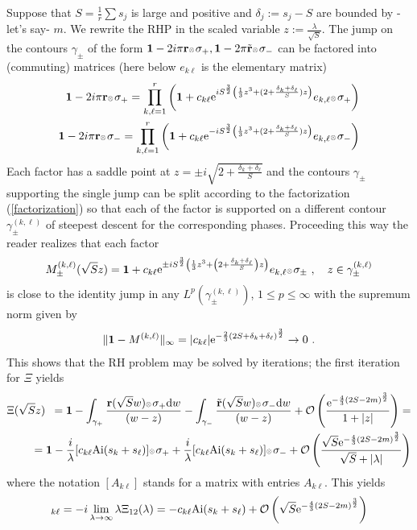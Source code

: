 \documentclass{article}
\def\ot{\hbox{\resizebox{6pt}{!}{$ \otimes \,
$}}}
\def\r{ {\mathbf r}}
\def\b{\beta}
\def\s{\sigma}
\def\&{&\hspace{-20pt}}
\def\d{{\rm d}}
\def\1{\mathbf 1}
\def\Ai{\mathrm{Ai}}
\def\Ai{\mathrm{Ai}}
\newcommand{\be}{\begin{eqnarray}}
\newcommand{\ee}{\end{eqnarray}}
\def\le{\left}
\def\ri{\right}
\begin{document}
Suppose that $S=\frac 1 r \sum s_j$ is large and positive and $\delta_j:= s_j-S$ are bounded by -let's say- $m$.
We rewrite the RHP in the scaled variable $z:= \frac { \lambda}{\sqrt S}$.  
 The jump on the  contours $\gamma_\pm$ of the form $\1 - 2i\pi \r\ot \s_+,\1-2\pi\tilde\r\ot\s_-$ can be factored into (commuting) matrices (here below $e_{k\ell}$ is the elementary matrix)
\be
\1 - 2i\pi \r \ot \s_+  = \prod _{k,\ell=1}^r \le( \1 +  c_{k\ell} {\rm e}^{ i S^{\frac 32} \le( \frac 1 3 z^3  +(2 + \frac {\delta_k+\delta_\ell}{S} )z\ri)} e_{k,\ell} \ot \s_+ \ri)\label{factorization}\\
\1 - 2i\pi \r \ot \s_-  = \prod _{k,\ell=1}^r \le( \1 +  c_{k\ell} {\rm e}^{ - i S^{\frac 32} \le( \frac 1 3 z^3  +(2 + \frac {\delta_k+\delta_\ell}{S} )z\ri)} e_{k,\ell} \ot \s_- \ri)
\ee
Each factor has a saddle point at $z = \pm i\sqrt{2 + \frac {\delta_k+\delta_\ell}{S} }$ and the contours $\gamma_\pm$ supporting the single jump can be split according to the factorization (\ref{factorization}) so that each of the factor is supported on a different contour $\gamma_\pm^{(k,\ell)}$ of steepest descent for the corresponding phases. Proceeding this way the reader realizes that each factor 
\be
M^{(k,\ell)}_\pm (\sqrt S z)  = \1 +  c_{k\ell} {\rm e}^{\pm iS^{\frac 32 }\le( \frac 1  3 z^3  +  \le(2  + \frac {\delta_k+\delta_\ell}S \ri)z\ri)} e_{k,\ell} \ot \s_\pm\ ,\ \ \ z \in \gamma_\pm ^{(k,\ell)} 
\ee
is close to the identity jump in any $L^p(\gamma_{\pm}^{(k,\ell)})$, $1\leq p \leq \infty$ with the supremum norm given by 
\be
\| \1  - M^{(k,\ell)}\|_\infty = |c_{k\ell}| {\rm e}^{-\frac 2 3 \le(2S + \delta_k + \delta_\ell\ri)^\frac 32} \to 0\ .
\ee
This shows that the RH problem may be solved by iterations; the first iteration for $\Xi$ yields 
\be
\Xi(\sqrt S z) &\& = \1 - \int_{\gamma_+} \frac {\r(\sqrt S w)\ot \s_+ \d w}{(w-z)} - \int_{\gamma_-} \frac {\tilde\r(\sqrt S w)\ot \s_- \d w}{(w-z)} + \mathcal O\le( \frac { {\rm e}^{-\frac 4 3(2S-2m)^\frac 32}}{1+|z|}\ri) = \\
&\& = \1 - \frac i {\lambda}  [c_{k\ell} \Ai(s_k+s_\ell)] \ot \s_+  +  \frac i {\lambda}  [c_{k\ell} \Ai(s_k+s_\ell)] \ot \s_-  +  \mathcal O\le( \frac {\sqrt {S} {\rm e}^{-\frac 4 3(2S-2m)^\frac 32}}{\sqrt S+|\lambda|}\ri) 
\ee
where the notation $[A_{k\ell}]$ stands for a matrix with entries $A_{k\ell}$.
This yields 
\be
 [\b_1]_{k \ell} =  -i \lim_{\lambda\to\infty}\lambda \Xi_{12}(\lambda) = -c_{k\ell} \Ai (s_k+s_\ell) +  \mathcal O\le(\sqrt{S} {\rm e}^{-\frac 4 3(2S-2m)^\frac 32}\ri) 
\ee
\end{document}
